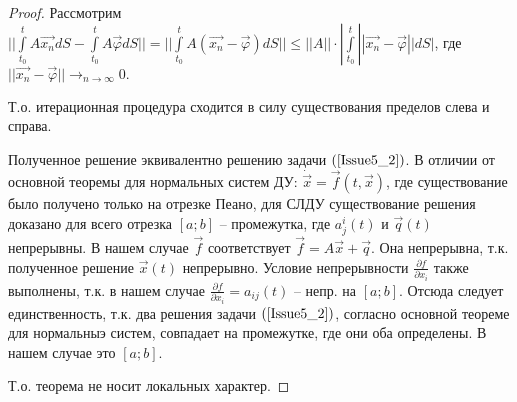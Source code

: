 \begin{proof}
Рассмотрим $|| \int\limits_{t_0}^{t} A\vec{x_n}dS - \int\limits_{t_0}^{t} A\vec{\varphi} dS || = || \int\limits_{t_0}^{t} A(\vec{x_n} - \vec{\varphi})dS || \leqslant ||A||\cdot | \int\limits_{t_0}^{t} ||\vec{x_n} - \vec{\varphi}|| dS | $, где $||\vec{x_n} - \vec{\varphi} || \rightarrow_{n\rightarrow \infty} 0.$

Т.о. итерационная процедура сходится в силу существования пределов слева и справа.

Полученное решение эквивалентно решению задачи $(\ref{Issue5_2})$. В отличии от основной теоремы для нормальных систем ДУ: $\dot{\vec{x}} = \vec{f}(t, \vec{x})$, где существование было получено только на отрезке Пеано, для СЛДУ существование решения доказано для всего отрезка $[a;b]$ -- промежутка, где $a_j^i(t)$ и $\vec{q}(t)$ непрерывны. В нашем случае $\vec{f}$ соответствует $\vec{f} = A\vec{x} + \vec{q}$. Она непрерывна, т.к. полученное решение $\vec{x}(t)$ непрерывно. Условие непрерывности $\frac{\partial f}{\partial x_i}$ также выполнены, т.к. в нашем случае $\frac{\partial f}{\partial x_i} = a_{ij}(t)$ -- непр. на $[a;b]$. Отсюда следует единственность, т.к. два решения задачи $(\ref{Issue5_2})$, согласно основной теореме для нормальныэ систем, совпадает на промежутке, где они оба определены. В нашем случае это $[a;b]$.

Т.о. теорема не носит локальных характер.

\end{proof}